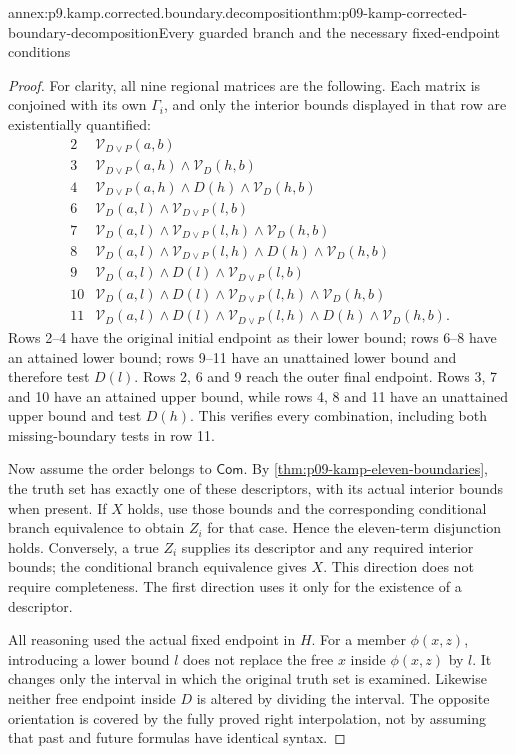 \begin{annexitem}{annex:p9.kamp.corrected.boundary.decomposition}{thm:p09-kamp-corrected-boundary-decomposition}{Every guarded branch and the necessary fixed-endpoint conditions}
\begin{proof}
For clarity, all nine regional matrices are the following. Each
matrix is conjoined with its own \(\Gamma_i\), and only the
interior bounds displayed in that row are existentially quantified:
\[
\begin{array}{c|l}
 2&\mathcal V_{D\lor P}(a,b)\\
 3&\mathcal V_{D\lor P}(a,h)\land\mathcal V_D(h,b)\\
 4&\mathcal V_{D\lor P}(a,h)\land D(h)\land\mathcal V_D(h,b)\\
 6&\mathcal V_D(a,l)\land\mathcal V_{D\lor P}(l,b)\\
 7&\mathcal V_D(a,l)\land\mathcal V_{D\lor P}(l,h)\land\mathcal V_D(h,b)\\
 8&\mathcal V_D(a,l)\land\mathcal V_{D\lor P}(l,h)\land D(h)
                                      \land\mathcal V_D(h,b)\\
 9&\mathcal V_D(a,l)\land D(l)\land\mathcal V_{D\lor P}(l,b)\\
 10&\mathcal V_D(a,l)\land D(l)\land\mathcal V_{D\lor P}(l,h)
                                      \land\mathcal V_D(h,b)\\
 11&\mathcal V_D(a,l)\land D(l)\land\mathcal V_{D\lor P}(l,h)
                                      \land D(h)\land\mathcal V_D(h,b).
\end{array}
\]
Rows 2--4 have the original initial endpoint as their lower bound;
rows 6--8 have an attained lower bound; rows 9--11 have an
unattained lower bound and therefore test \(D(l)\).
Rows 2, 6 and 9 reach the outer final endpoint. Rows 3, 7 and
10 have an attained upper bound, while rows 4, 8 and 11 have
an unattained upper bound and test \(D(h)\). This verifies
every combination, including both missing-boundary tests in row 11.

Now assume the order belongs to \(\mathsf{Com}\).
By \cref{thm:p09-kamp-eleven-boundaries}, the truth set has
exactly one of these descriptors, with its actual interior bounds
when present. If \(X\) holds, use those bounds and the
corresponding conditional branch equivalence to obtain \(Z_i\)
for that case. Hence the eleven-term disjunction holds.
Conversely, a true \(Z_i\) supplies its descriptor and any
required interior bounds; the conditional branch equivalence gives
\(X\). This direction does not require completeness.
The first direction uses it only for the existence of a descriptor.

All reasoning used the actual fixed endpoint in \(H\).
For a member \(\phi(x,z)\), introducing a lower bound \(l\)
does not replace the free \(x\) inside \(\phi(x,z)\) by
\(l\). It changes only the interval in which the original
truth set is examined. Likewise neither free endpoint inside
\(D\) is altered by dividing the interval. The opposite
orientation is covered by the fully proved right interpolation,
not by assuming that past and future formulas have identical syntax.


\end{proof}
\end{annexitem}
